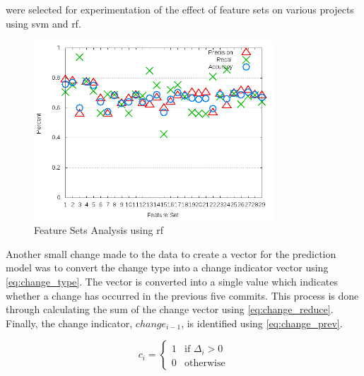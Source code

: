 
\renewcommand*{\thefootnote}{\arabic{footnote}}

\noindent were selected for experimentation of the effect of feature sets on various projects using \gls{svm} and \gls{rf}.

\begin{figure}[!t]
    \centering
        \includegraphics[width=0.8\textwidth]{images/rf/test_6/acra_sample_range}
        \caption{Feature Sets Analysis using \gls{rf}}
        \label{fig:feature_set_acra_rf}
\end{figure}

Another small change made to the data to create a vector for the prediction model was to convert the change type into a change indicator vector using \autoref{eq:change_type}. The vector is converted into a single value which indicates whether a change has occurred in the previous five commits. This process is done through calculating the sum of the change vector using \autoref{eq:change_reduce}. Finally, the change indicator, $change_{i-1}$, is identified using \autoref{eq:change_prev}.

\begin{equation} 
\label{eq:change_type}
c_i = \left\{\begin{matrix}
1 & \text{if }\Delta_i > 0 \\
0 & \text{otherwise}
\end{matrix}\right.
\end{equation}

